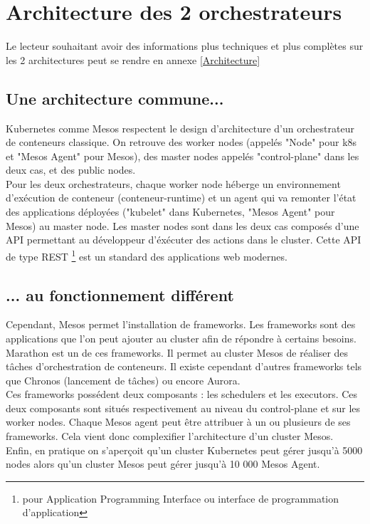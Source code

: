 \documentclass[11pt,fleqn]{book} %
\begin{document}
\section{Architecture des 2 orchestrateurs}
Le lecteur souhaitant avoir des informations plus techniques et plus complètes sur les 2 architectures peut se rendre en annexe \ref{Architecture}
\subsection{Une architecture commune...}
Kubernetes comme Mesos respectent le design d'architecture d'un orchestrateur de conteneurs classique. On retrouve des worker nodes (appelés "Node" pour k8s et "Mesos Agent" pour Mesos), des master nodes appelés "control-plane" dans les deux cas, et des public nodes.\\

Pour les deux orchestrateurs, chaque worker node héberge un environnement d'exécution de conteneur (conteneur-runtime) et un agent qui va remonter l'état des applications déployées ("kubelet" dans Kubernetes, "Mesos Agent" pour Mesos) au master node. Les master nodes sont dans les deux cas composés d'une API permettant au développeur d'éxécuter des actions dans le cluster. Cette API de type REST \footnote{pour Application Programming Interface ou interface de programmation d’application} est un standard des applications web modernes.

\subsection{... au fonctionnement différent}
Cependant, Mesos permet l'installation de frameworks. Les frameworks sont des applications que l'on peut ajouter au cluster afin de répondre à certains besoins. Marathon est un de ces frameworks. Il permet au cluster Mesos de réaliser des tâches d'orchestration de conteneurs. Il existe cependant d'autres frameworks tels que Chronos (lancement de tâches) ou encore Aurora.\\

Ces frameworks possédent deux composants : les schedulers et les executors. Ces deux composants sont situés respectivement au niveau du control-plane et sur les worker nodes. Chaque Mesos agent peut être attribuer à un ou plusieurs de ses frameworks. Cela vient donc complexifier l'architecture d'un cluster Mesos.\\

Enfin, en pratique on s'aperçoit qu'un cluster Kubernetes peut gérer jusqu'à 5000 nodes alors qu'un cluster Mesos peut gérer jusqu'à 10 000 Mesos Agent.
\end{document}
